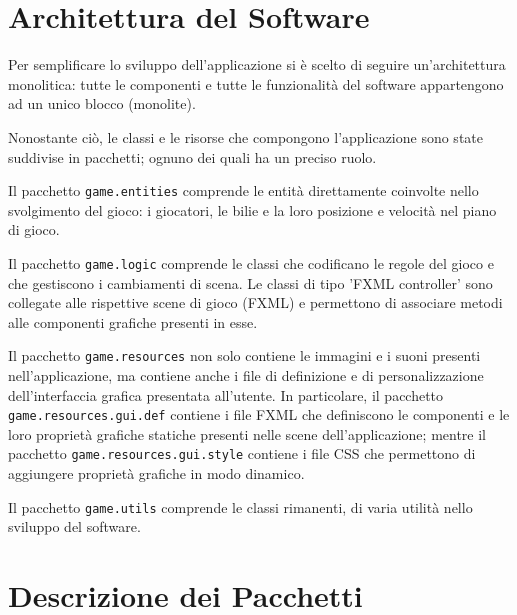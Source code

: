 \documentclass[12pt,a4paper]{report}
\begin{document}
\section{Architettura del Software}\label{se:Software Architecture} %

Per semplificare lo sviluppo dell'applicazione si è scelto di seguire un'architettura monolitica: tutte le componenti e tutte le funzionalità del software appartengono ad un unico blocco (monolite).

Nonostante ciò, le classi e le risorse che compongono l'applicazione sono state suddivise in pacchetti; ognuno dei quali ha un preciso ruolo.

\vspace{3mm}

Il pacchetto \texttt{game.entities} comprende le entità direttamente coinvolte nello svolgimento del gioco: i giocatori, le bilie e la loro posizione e velocità nel piano di gioco.

\vspace{3mm}

Il pacchetto \texttt{game.logic} comprende le classi che codificano le regole del gioco e che gestiscono i cambiamenti di scena.
Le classi di tipo 'FXML controller' sono collegate alle rispettive scene di gioco (FXML) e permettono di associare metodi alle componenti grafiche presenti in esse.

\vspace{3mm}

Il pacchetto \texttt{game.resources} non solo contiene le immagini e i suoni presenti nell'applicazione, ma contiene anche i file di definizione e di personalizzazione dell'interfaccia grafica presentata all'utente.
In particolare, il pacchetto \texttt{game.resources.gui.def} contiene i file FXML che definiscono le componenti e le loro proprietà grafiche statiche presenti nelle scene dell'applicazione; mentre il pacchetto \texttt{game.resources.gui.style} contiene i file CSS che permettono di aggiungere proprietà grafiche in modo dinamico.

\vspace{3mm}

Il pacchetto \texttt{game.utils} comprende le classi rimanenti, di varia utilità nello sviluppo del software.


\section{Descrizione dei Pacchetti}\label{se:Packages Description} %
\end{document}
